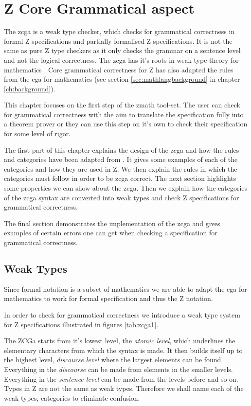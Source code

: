 \chapter{Z Core Grammatical aspect}
\label{ch:zcga}

The \gls{zcga} is a weak type checker, which checks for grammatical correctness
in formal Z specifications and partially formalised Z specifications. It is not
the same as pure Z type checkers as it only checks the grammar on a sentence
level and not the logical correctness. The \gls{zcga} has it's roots in weak
type theory for mathematics \cite{wtt}. Core grammatical correctness for Z has
also adapted the rules from the \gls{cga} for mathematics (see section
\ref{sec:mathlangbackground} in chapter \ref{ch:background}).

This chapter focuses on the first step of the \gls{zmath} tool-set. The user can
check for grammatical correctness with the aim to translate the specification
fully into a theorem prover or they can use this step on it's own to check their
specification for some level of rigor.

The first part of this chapter explains the design of the \gls{zcga} and how the
rules and categories have been adapted from \cite{wtt}. It gives some examples
of each of the categories and how they are used in Z. We then explain the rules
in which the categories must follow in order to be \gls{zcga} correct. The next
section highlights some properties we can show about the \gls{zcga}. Then we
explain how the categories of the \gls{zcga} syntax are converted into weak
types and check Z specifications for grammatical correctness.

The final section demonstrates the implementation of the \gls{zcga} and gives
examples of certain errors one can get when checking a specification for
grammatical correctness.

\section{Weak Types}

Since formal notation is a subset of mathematics we are able to adapt the
\gls{cga} for mathematics to work for formal specification and thus the Z
notation.

In order to check for grammatical correctness we introduce a weak type system
for Z specifications illustrated in figures \ref{tab:zcga1}.
 
The ZCGa starts from it's lowest level, the \emph{atomic level}, which
underlines the elementary characters from which the syntax is made. It then
builds itself up to the highest level, \emph{discourse level} where the largest
elements can be found. Everything in the \emph{discourse} can be made from
elements in the smaller levels. Everything in the \emph{sentence level} can be
made from the levels before and so on. Types in Z are not the same as weak
types. Therefore we shall name each of the weak types, categories to eliminate
confusion.

